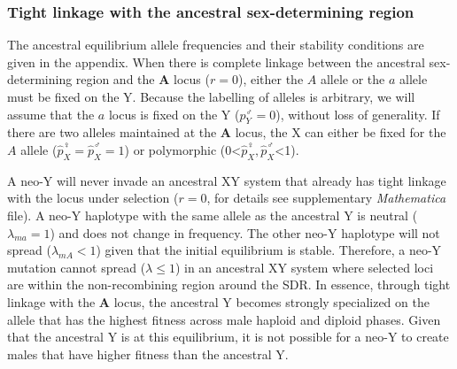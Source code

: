 \documentclass[12pt]{article}
\begin{document}
\subsubsection*{Tight linkage with the ancestral sex-determining region}

The ancestral equilibrium allele frequencies and their stability conditions are given in the appendix.
When there is complete linkage between the ancestral sex-determining region and the \textbf{A} locus ($r=0$), either the $A$ allele or the $a$ allele must be fixed on the Y. 
Because the labelling of alleles is arbitrary, we will assume that the $a$ locus is fixed on the Y ($p^\male_Y=0$), without loss of generality. 
If there are two alleles maintained at the \textbf{A} locus, the X can either be fixed for the $A$ allele ($\hat{p}^\female_X=\hat{p}^\male_X=1$) or polymorphic (0<$\hat{p}^\female_X, \hat{p}^\male_X$<1). 

A neo-Y will never invade an ancestral XY system that already has tight linkage with the locus under selection ($r=0$, for details see supplementary \textit{Mathematica} file). 
A neo-Y haplotype with the same allele as the ancestral Y is neutral ($\lambda_{ma}=1$) and does not change in frequency.
The other neo-Y haplotype will not spread ($\lambda_{mA}<1$) given that the initial equilibrium is stable. 
Therefore, a neo-Y mutation cannot spread ($\lambda \leq 1$) in an ancestral XY system where selected loci are within the non-recombining region around the SDR.
In essence, through tight linkage with the \textbf{A} locus, the ancestral Y becomes strongly specialized on the allele that has the highest fitness across male haploid and diploid phases. 
Given that the ancestral Y is at this equilibrium, it is not possible for a neo-Y to create males that have higher fitness than the ancestral Y. 

\end{document}
